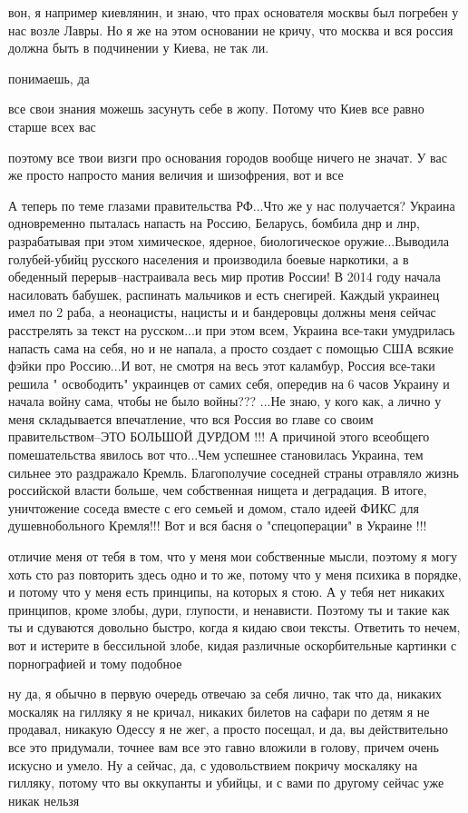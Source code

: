 вон, я например киевлянин, и знаю, что прах основателя москвы был погребен у
нас возле Лавры. Но я же на этом основании не кричу, что москва и вся россия
должна быть в подчинении у Киева, не так ли.

понимаешь, да

все свои знания можешь засунуть себе в жопу. Потому что Киев все равно старше
всех вас

поэтому все твои визги про основания городов вообще ничего не значат. У вас же
просто напросто мания величия и шизофрения, вот и все

А теперь по теме глазами правительства РФ...Что же у нас получается? Украина
одновременно пыталась напасть на Россию, Беларусь, бомбила днр и лнр,
разрабатывая при этом химическое, ядерное, биологическое оружие...Выводила
голубей-убийц русского населения и производила боевые наркотики, а в обеденный
перерыв--настраивала весь мир против России! В 2014 году начала насиловать
бабушек, распинать мальчиков и есть снегирей. Каждый украинец имел по 2 раба, а
неонацисты, нацисты и и бандеровцы должны меня сейчас расстрелять за текст на
русском...и при этом всем, Украина все-таки умудрилась напасть сама на себя, но
и не напала, а просто создает с помощью США всякие фэйки про Россию...И вот, не
смотря на весь этот каламбур, Россия все-таки решила " освободить" украинцев от
самих себя, опередив на 6 часов Украину и начала войну сама, чтобы не было
войны??? ...Не знаю, у кого как, а лично у меня складывается впечатление, что
вся Россия во главе со своим правительством--ЭТО БОЛЬШОЙ ДУРДОМ !!! А причиной
этого всеобщего помешательства явилось вот что...Чем успешнее становилась
Украина, тем сильнее это раздражало Кремль. Благополучие соседней страны
отравляло жизнь российской власти больше, чем собственная нищета и деградация.
В итоге, уничтожение соседа вместе с его семьей и домом, стало идеей ФИКС для
душевнобольного Кремля!!! Вот и вся басня о "спецоперации" в Украине !!!

отличие меня от тебя в том, что у меня мои собственные мысли, поэтому я могу
хоть сто раз повторить здесь одно и то же, потому что у меня психика в порядке,
и потому что у меня есть принципы, на которых я стою. А у тебя нет никаких
принципов, кроме злобы, дури, глупости, и ненависти. Поэтому ты и такие как ты
и сдуваются довольно быстро, когда я кидаю свои тексты. Ответить то нечем, вот
и истерите в бессильной злобе, кидая различные оскорбительные картинки с
порнографией и тому подобное

ну да, я обычно в первую очередь отвечаю за себя лично, так что да, никаких
москаляк на гилляку я не кричал, никаких билетов на сафари по детям я не
продавал, никакую Одессу я не жег, а просто посещал, и да, вы действительно все
это придумали, точнее вам все это гавно вложили в голову, причем очень искусно
и умело. Ну а сейчас, да, с удовольствием покричу москаляку на гилляку, потому
что вы оккупанты и убийцы, и с вами по другому сейчас уже никак нельзя

